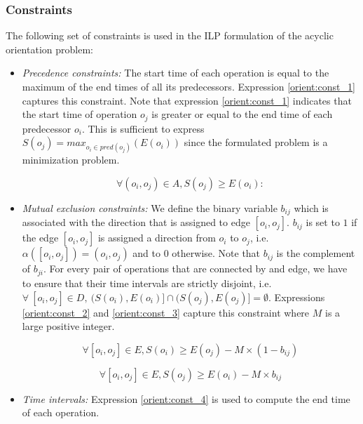 \subsubsection{Constraints}

The following set of constraints is used in the ILP formulation of the acyclic orientation problem:

\begin{itemize}

\item \textit{Precedence constraints:} The start time of each operation is equal to the maximum of the end times of all its predecessors. Expression \ref{orient:const_1} captures this constraint. Note that expression \ref{orient:const_1} indicates that the start time of operation $o_j$ is greater or equal to the end time of each predecessor $o_i$. This is sufficient to express $S(o_j) = max_{o_i \in pred(o_j)}(E(o_i))$ since the formulated problem is a minimization problem.

\begin{equation}
\forall (o_i,o_j) \in A, S(o_j) \geq E(o_i):
\label{orient:const_1}
\end{equation}

\item \textit{Mutual exclusion constraints:} We define the binary variable $b_{ij}$ which is associated with the direction that is assigned to edge $[o_i,o_j]$. $b_{ij}$ is set to $1$ if the edge $[o_i,o_j]$ is assigned a direction from $o_i$ to $o_j$, i.e. $\alpha([o_i,o_j]) = (o_i,o_j)$ and to $0$ otherwise. Note that $b_{ij}$ is the complement of $b_{ji}$. For every pair of operations that are connected by and edge, we have to ensure that their time intervals are strictly disjoint, i.e. $\forall\ [o_i,o_j] \in D,\  (S(o_i), E(o_i)] \cap (S(o_j), E(o_j)] = \emptyset$. Expressions \ref{orient:const_2} and \ref{orient:const_3} capture this constraint where $M$ is a large positive integer.

\begin{equation}
\forall [o_i,o_j] \in E, S(o_i) \geq E(o_j) - M \times (1-b_{ij})
\label{orient:const_2}
\end{equation} 

\begin{equation}
\forall [o_i,o_j] \in E, S(o_j) \geq E(o_i) - M \times b_{ij}
\label{orient:const_3}
\end{equation}

\item \textit{Time intervals:} Expression \ref{orient:const_4} is used to compute the end time of each operation.


\end{itemize}
